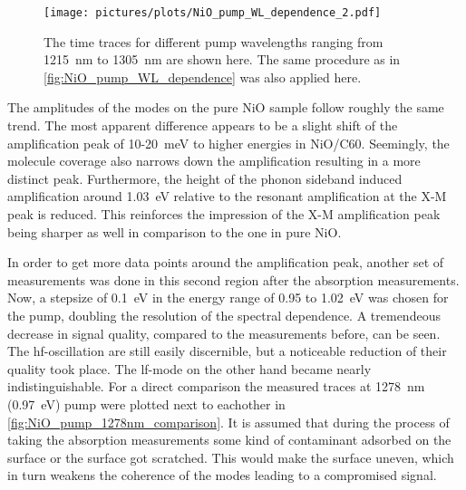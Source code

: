 \begin{figure}[ht]
    \centering
    \texttt{[image: pictures/plots/NiO\_pump\_WL\_dependence\_2.pdf]} \vspace*{-15pt}
    \caption{The time traces for different pump wavelengths ranging from \qty{1215}{nm} to \qty{1305}{nm} are shown here. The same procedure as in \autoref{fig:NiO_pump_WL_dependence} was also applied here.}
    \label{fig:NiO_pump_WL_dependence_2}
\end{figure}
The amplitudes of the modes on the pure NiO sample follow roughly the same trend.
The most apparent difference appears to be a slight shift of the amplification peak of 10-\qty{20}{meV} to higher energies in NiO/C60.
Seemingly, the molecule coverage also narrows down the amplification resulting in a more distinct peak.
Furthermore, the height of the phonon sideband induced amplification around \qty{1.03}{eV} relative to the resonant amplification at the X-M peak is reduced.
This reinforces the impression of the X-M amplification peak being sharper as well in comparison to the one in pure NiO.

In order to get more data points around the amplification peak, another set of measurements was done in this second region after the absorption measurements.
Now, a stepsize of \qty{0.1}{eV} in the energy range of 0.95 to \qty{1.02}{eV} was chosen for the pump, doubling the resolution of the spectral dependence.
A tremendeous decrease in signal quality, compared to the measurements before, can be seen.
The hf-oscillation are still easily discernible, but a noticeable reduction of their quality took place.
The lf-mode on the other hand became nearly indistinguishable.
For a direct comparison the measured traces at \qty{1278}{nm} (\qty{0.97}{eV}) pump were plotted next to eachother in \autoref{fig:NiO_pump_1278nm_comparison}.
It is assumed that during the process of taking the absorption measurements some kind of contaminant adsorbed on the surface or the surface got scratched.
This would make the surface uneven, which in turn weakens the coherence of the modes leading to a compromised signal.

